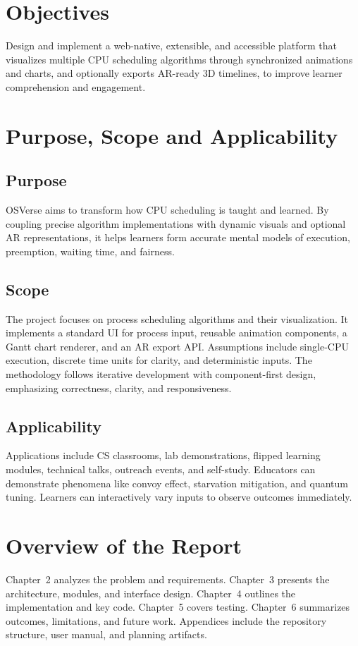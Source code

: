 \documentclass[12pt,a4paper,oneside]{report}
\begin{document}
\section{Objectives}
Design and implement a web-native, extensible, and accessible platform that visualizes multiple CPU scheduling algorithms through synchronized animations and charts, and optionally exports AR-ready 3D timelines, to improve learner comprehension and engagement.

\section{Purpose, Scope and Applicability}
\subsection{Purpose}
OSVerse aims to transform how CPU scheduling is taught and learned. By coupling precise algorithm implementations with dynamic visuals and optional AR representations, it helps learners form accurate mental models of execution, preemption, waiting time, and fairness.

\subsection{Scope}
The project focuses on process scheduling algorithms and their visualization. It implements a standard UI for process input, reusable animation components, a Gantt chart renderer, and an AR export API. Assumptions include single-CPU execution, discrete time units for clarity, and deterministic inputs. The methodology follows iterative development with component-first design, emphasizing correctness, clarity, and responsiveness.

\subsection{Applicability}
Applications include CS classrooms, lab demonstrations, flipped learning modules, technical talks, outreach events, and self-study. Educators can demonstrate phenomena like convoy effect, starvation mitigation, and quantum tuning. Learners can interactively vary inputs to observe outcomes immediately.

\section{Overview of the Report}
Chapter~2 analyzes the problem and requirements. Chapter~3 presents the architecture, modules, and interface design. Chapter~4 outlines the implementation and key code. Chapter~5 covers testing. Chapter~6 summarizes outcomes, limitations, and future work. Appendices include the repository structure, user manual, and planning artifacts.
\end{document}

